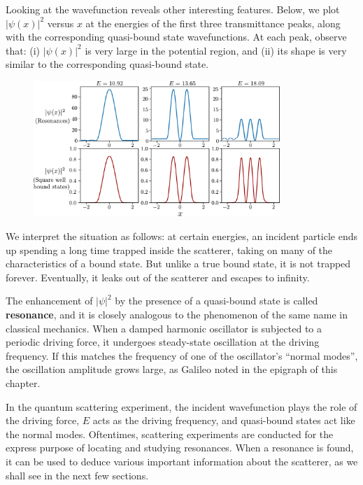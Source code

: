\documentclass[prx,12pt]{revtex4-2}
\begin{document}
Looking at the wavefunction reveals other interesting features.
Below, we plot $|\psi(x)|^2$ versus $x$ at the energies of the first
three transmittance peaks, along with the corresponding quasi-bound
state wavefunctions.  At each peak, observe that: (i) $|\psi(x)|^2$ is
very large in the potential region, and (ii) its shape is very similar
to the corresponding quasi-bound state.

\begin{figure}[h]
  \centering\includegraphics[width=0.83\textwidth]{resonancewavefunctions}
\end{figure}

\noindent
We interpret the situation as follows: at certain energies, an
incident particle ends up spending a long time trapped inside the
scatterer, taking on many of the characteristics of a bound state.
But unlike a true bound state, it is not trapped forever.  Eventually,
it leaks out of the scatterer and escapes to infinity.

The enhancement of $|\psi|^2$ by the presence of a quasi-bound state
is called \textbf{resonance}, and it is closely analogous to the
phenomenon of the same name in classical mechanics.  When a damped
harmonic oscillator is subjected to a periodic driving force, it
undergoes steady-state oscillation at the driving frequency.  If this
matches the frequency of one of the oscillator's ``normal modes'', the
oscillation amplitude grows large, as Galileo noted in the epigraph of
this chapter.

In the quantum scattering experiment, the incident wavefunction plays
the role of the driving force, $E$ acts as the driving frequency, and
quasi-bound states act like the normal modes.  Oftentimes, scattering
experiments are conducted for the express purpose of locating and
studying resonances.  When a resonance is found, it can be used to
deduce various important information about the scatterer, as we shall
see in the next few sections.
\end{document}
